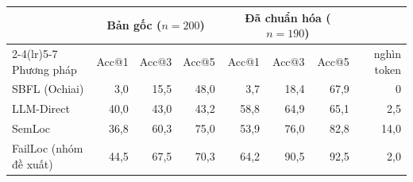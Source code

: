 \begin{tabular}{lrrrrrrr}
\toprule
 & \multicolumn{3}{c}{Bản gốc ($n=200$)} & \multicolumn{3}{c}{Đã chuẩn hóa ($n=190$)} & \\
\cmidrule(lr){2-4}\cmidrule(lr){5-7}
Phương pháp & Acc@1 & Acc@3 & Acc@5 & Acc@1 & Acc@3 & Acc@5 & nghìn token \\
\midrule
SBFL (Ochiai) & 3,0 & 15,5 & 48,0 & 3,7 & 18,4 & 67,9 & 0 \\
LLM-Direct & 40,0 & 43,0 & 43,2 & 58,8 & 64,9 & 65,1 & 2,5 \\
SemLoc & 36,8 & 60,3 & 75,0 & 53,9 & 76,0 & 82,8 & 14,0 \\
FailLoc (nhóm đề xuất) & 44,5 & 67,5 & 70,3 & 64,2 & 90,5 & 92,5 & 2,0 \\
\bottomrule
\end{tabular}

